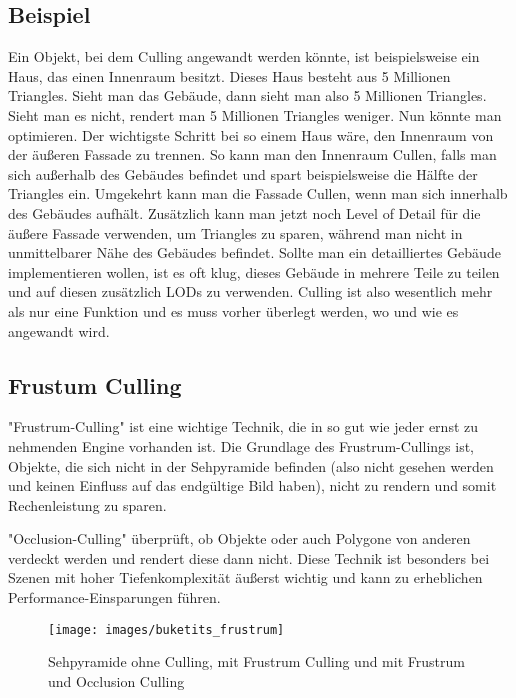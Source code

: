 \subsection{Beispiel}
Ein Objekt, bei dem Culling angewandt werden könnte, ist beispielsweise ein Haus, das einen Innenraum besitzt. Dieses Haus besteht aus 5 Millionen Triangles. Sieht man das Gebäude, dann sieht man also 5 Millionen Triangles. Sieht man es nicht, rendert man 5 Millionen Triangles weniger. Nun könnte man optimieren.\cite{_cryengine_culling}
Der wichtigste Schritt bei so einem Haus wäre, den Innenraum von der äußeren Fassade zu trennen. So kann man den Innenraum Cullen, falls man sich außerhalb des Gebäudes befindet und spart beispielsweise die Hälfte der Triangles ein. Umgekehrt kann man die Fassade Cullen, wenn man sich innerhalb des Gebäudes aufhält.\cite{_cryengine_culling}
Zusätzlich kann man jetzt noch Level of Detail für die äußere Fassade verwenden, um Triangles zu sparen, während man nicht in unmittelbarer Nähe des Gebäudes befindet. Sollte man ein detailliertes Gebäude implementieren wollen, ist es oft klug, dieses Gebäude in mehrere Teile zu teilen und auf diesen zusätzlich LODs zu verwenden. Culling ist also wesentlich mehr als nur eine Funktion und es muss vorher überlegt werden, wo und wie es angewandt wird.
\cite{_cryengine_culling}

\subsection{Frustum Culling}
"Frustrum-Culling" ist eine wichtige Technik, die in so gut wie jeder ernst zu nehmenden Engine vorhanden ist. Die Grundlage des Frustrum-Cullings ist, Objekte, die sich nicht in der Sehpyramide befinden (also nicht gesehen werden und keinen Einfluss auf das endgültige Bild haben), nicht zu rendern und somit Rechenleistung zu sparen.
\cite{_cryengine_culling}

"Occlusion-Culling" überprüft, ob Objekte oder auch Polygone von anderen verdeckt werden und rendert diese dann nicht. Diese Technik ist besonders bei Szenen mit hoher Tiefenkomplexität äußerst wichtig und kann zu erheblichen Performance-Einsparungen führen.
\cite{_cryengine_culling}

\begin{figure}[H]
	\centering
	\texttt{[image: images/buketits\_frustrum]}
	\caption{Sehpyramide ohne Culling, mit Frustrum Culling und mit Frustrum und Occlusion Culling\cite{_culling}}
\end{figure}

